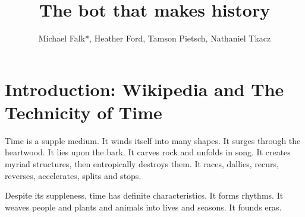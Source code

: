 \documentclass[Royal,times,sageh]{sagej}
\begin{document}

\title{The bot that makes history}


\author{Michael Falk*, Heather Ford, Tamson
Pietsch, Nathaniel Tkacz}






\maketitle

\hypertarget{introduction-wikipedia-and-the-technicity-of-time}{%
\section{Introduction: Wikipedia and The Technicity of
Time}\label{introduction-wikipedia-and-the-technicity-of-time}}

Time is a supple medium. It winds itself into many shapes. It surges
through the heartwood. It lies upon the bark. It carves rock and unfolds
in song. It creates myriad structures, then entropically destroys them.
It races, dallies, recurs, reverses, accelerates, splits and stops.

Despite its suppleness, time has definite characteristics. It forms
rhythms. It weaves people and plants and animals into lives and seasons.
It founds eras.
\end{document}

